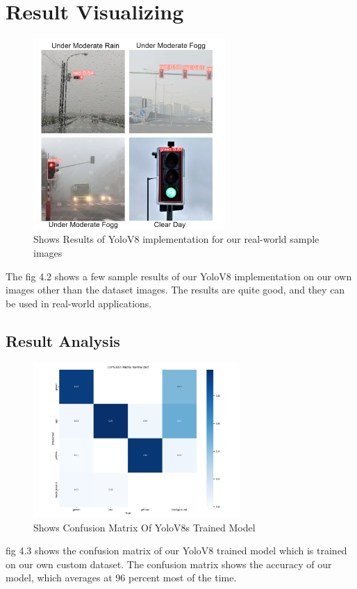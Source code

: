 \documentclass[12 pt]{report}
\begin{document}
\section{Result Visualizing}
 {
  \begin{figure}[h]
    \centering
    \includegraphics[width=0.65\textwidth]{Results Collgess.jpg}
    \caption{Shows Results of YoloV8 implementation for our real-world sample images}
    \label{fig:Results achieved from YoloV8s Implementation}
  \end{figure}
  \justify
  \hspace*{1cm} The fig 4.2 shows a few sample results of our YoloV8 implementation on our own images other than the dataset images. The results are quite good, and they can be used in real-world applications.
  \newpage
  \subsection{Result Analysis}
  {
    \begin{figure}[h]
      \centering
      \includegraphics[width=0.7\textwidth]{confusion_matrix_normalized.png}
      \caption{Shows Confusion Matrix Of YoloV8s Trained Model}
      \label{fig:Confusion Matrix YoloV8 Trained Model}
    \end{figure}
    \justify
    \hspace*{1cm} fig 4.3 shows the confusion matrix of our YoloV8 trained model which is trained on our own custom dataset. The confusion matrix shows the accuracy of our model, which averages at 96 percent most of the time.

}}
\end{document}
